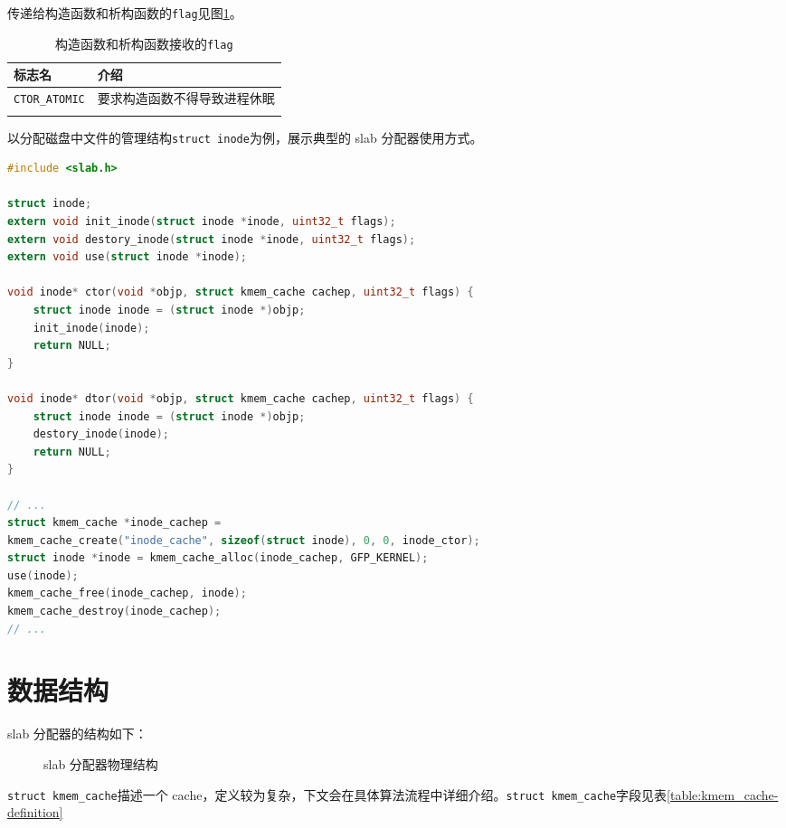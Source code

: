\documentclass[AutoFakeBold]{LZUThesis}
\begin{document}
\begin{sloppypar}
传递给构造函数和析构函数的\texttt{flag}见图\ref{table:ctor-dtor-flags}。

\begin{longtable}[]{@{}ll@{}}
\toprule\noalign{}
标志名 & 介绍 \\
\midrule\noalign{}
\endhead
\bottomrule\noalign{}
\endlastfoot
\texttt{CTOR\_ATOMIC} & 要求构造函数不得导致进程休眠 \\
\label{table:ctor-dtor-flags}
\caption{构造函数和析构函数接收的\texttt{flag}}
\end{longtable}

以分配磁盘中文件的管理结构\texttt{struct\ inode}为例，展示典型的 slab
分配器使用方式。

\begin{lstlisting}[language = c]
#include <slab.h>

struct inode;
extern void init_inode(struct inode *inode, uint32_t flags);
extern void destory_inode(struct inode *inode, uint32_t flags);
extern void use(struct inode *inode);

void inode* ctor(void *objp, struct kmem_cache cachep, uint32_t flags) {
    struct inode inode = (struct inode *)objp;
    init_inode(inode);
    return NULL;
}

void inode* dtor(void *objp, struct kmem_cache cachep, uint32_t flags) {
    struct inode inode = (struct inode *)objp;
    destory_inode(inode);
    return NULL;
}

// ...
struct kmem_cache *inode_cachep =
kmem_cache_create("inode_cache", sizeof(struct inode), 0, 0, inode_ctor);
struct inode *inode = kmem_cache_alloc(inode_cachep, GFP_KERNEL);
use(inode);
kmem_cache_free(inode_cachep, inode);
kmem_cache_destroy(inode_cachep);
// ...

\end{lstlisting}


\section{数据结构}

slab 分配器的结构如下：

\begin{figure}
\centering

\caption{slab 分配器物理结构}
\end{figure}

\texttt{struct\ kmem\_cache}描述一个
cache，定义较为复杂，下文会在具体算法流程中详细介绍。\texttt{struct\ kmem\_cache}字段见表\ref{table:kmem_cache-definition}


\end{sloppypar}
\end{document}
